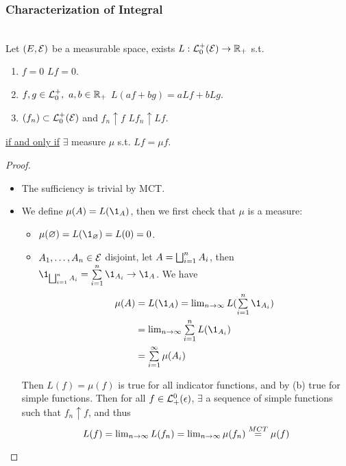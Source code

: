 \vspace{12pt}
\subsubsection{Characterization of Integral}
\begin{theorem}\label{Daniell's Theorem}\ \\
Let $(E,\mathcal{E})$ be a measurable space, exists $L : \mathcal{L}_0^+(\mathcal{E}) \to \mathbb{R}_+$ s.t. 
\begin{enumerate}[label = (\alph*)]
    \item $f = 0$ \imply $L f = 0$.
    \item $f,g \in \mathcal{L}_0^+,\ a,b \in \mathbb{R}_+$ \imply $L(af + bg) = a L f + b L g$.
    \item $(f_n) \subset \mathcal{L}_0^+ (\mathcal{E})$ and $f_n \uparrow f$ \imply $L f_n \uparrow L f$.
\end{enumerate}
\underline{if and only if} $\exists$ measure $\mu$ s.t. $Lf = \mu f$.
\end{theorem}
\begin{proof}\ 
 \begin{itemize}
     \item The sufficiency is trivial by MCT.
     \item We define $\mu(A) = L(\1_A)$, then we first check that $\mu$ is a measure:
     \begin{itemize}
         \item $\mu(\emp) = L(\1_\emp) = L(0) = 0$.
         \item $A_1,\dots,A_n \in \mathcal{E}$ disjoint, let $A = \bigsqcup_{i=1}^{n} A_i$, then $\1_{\kupp{i=1}{n} A_i} = \summ{i=1}{n} \1_{A_i} \to \1_A$. We have
         \begin{align*}
             \mu(A) &= L(\1_A) = \limm{n}{\infty} L(\summ{i=1}{n} \1_{A_i})\\
             &= \limm{n}{\infty} \summ{i=1}{n} L(\1_{A_i})\\
             &= \summ{i=1}{\infty} \mu(A_i)
         \end{align*}
     \end{itemize}
     Then $L(f) = \mu (f)$ is true for all indicator functions, and by (b) true for simple functions. Then for all $f \in \mathcal{L}_+^0 (\epsilon)$, $\exists$ a sequence of simple functions such that $f_n \uparrow f$, and thus
     \begin{equation*}
         L(f) = \textstyle\lim_{n \to \infty} L(f_n) = \textstyle\lim_{n \to \infty} \mu(f_n) \overset{MCT}{=} \mu(f)
     \end{equation*}
 \end{itemize}
\end{proof}


